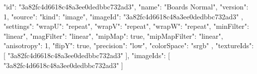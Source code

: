 {
  "id": "3a82fc4d6618c48a3ee0dedbbc732ad3",
  "name": "Boards Normal",
  "version": 1,
  "source": {
    "kind": "image",
    "imageId": "3a82fc4d6618c48a3ee0dedbbc732ad3"
  },
  "settings": {
    "wrapU": "repeat",
    "wrapV": "repeat",
    "wrapW": "repeat",
    "minFilter": "linear",
    "magFilter": "linear",
    "mipMap": true,
    "mipMapFilter": "linear",
    "anisotropy": 1,
    "flipY": true,
    "precision": "low",
    "colorSpace": "srgb"
  },
  "textureIds": [
    "3a82fc4d6618c48a3ee0dedbbc732ad3"
  ],
  "imageIds": [
    "3a82fc4d6618c48a3ee0dedbbc732ad3"
  ]
}
